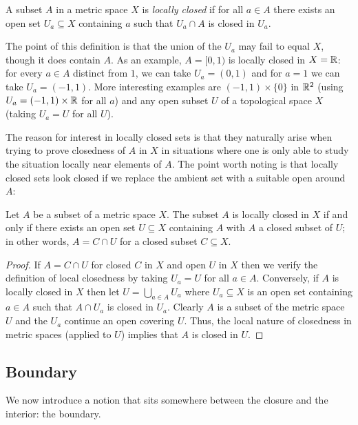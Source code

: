 \begin{definition}
  A subset \(A\) in a metric space \(X\) is \emph{locally closed} if for
  all \(a\in A\) there exists an open set \(U_a\subseteq X\) containing
  \(a\) such that \(U_a\cap A\) is closed in \(U_a\).
\end{definition}

The point of this definition is that the union of the \(U_a\) may fail to
equal \(X\), though it does contain \(A\). As an example, \(A=[0,1)\) is
locally closed in \(X=\mathbb{R}\): for every \(a\in A\) distinct from \(1\), we
can take \(U_a=(0,1)\) and for \(a=1\) we can take \(U_a=(-1,1)\). More
interesting examples are \((-1,1)\times\{0\}\) in \(\mathbb{R}^2\) (using
\(U_a=(-1,1)\times\mathbb{R}\) for all \(a\)) and any open subset \(U\) of a
topological space \(X\) (taking \(U_a=U\) for all \(U\)).

The reason for interest in locally closed sets is that they naturally arise
when trying to prove closedness of \(A\) in \(X\) in situations where one
is only able to study the situation locally near elements of \(A\). The
point worth noting is that locally closed sets look closed if we replace
the ambient set with a suitable open around \(A\):

\begin{theorem}
  Let \(A\) be a subset of a metric space \(X\). The subset \(A\) is
  locally closed in \(X\) if and only if there exists an open set
  \(U\subseteq X\) containing \(A\) with \(A\) a closed subset of \(U\); in
  other words, \(A=C\cap U\) for a closed subset \(C\subseteq X\).
\end{theorem}
\begin{proof}
  If \(A=C\cap U\) for closed \(C\) in \(X\) and open \(U\) in \(X\) then
  we verify the definition of local closedness by taking \(U_a=U\) for all
  \(a\in A\). Conversely, if \(A\) is locally closed in \(X\) then let
  \(U=\bigcup_{a\in A}U_a\) where \(U_a\subseteq X\) is an open set
  containing \(a\in A\) such that \(A\cap U_a\) is closed in
  \(U_a\). Clearly \(A\) is a subset of the metric space \(U\) and the
  \(U_a\) continue an open covering \(U\). Thus, the local nature of
  closedness in metric spaces (applied to \(U\)) implies that \(A\) is
  closed in \(U\).
\end{proof}

\subsection{Boundary}
We now introduce a notion that sits somewhere between the closure and the
interior: the boundary.

